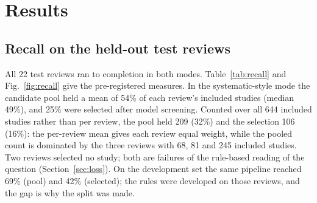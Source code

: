 \section{Results}
\label{sec:results}

\subsection{Recall on the held-out test reviews}

All 22 test reviews ran to completion in both modes. Table~\ref{tab:recall} and Fig.~\ref{fig:recall} give the
pre-registered measures. In the systematic-style mode the candidate pool held a mean of 54\% of each review's
included studies (median 49\%), and 25\% were selected after model screening. Counted over all 644 included studies
rather than per review, the pool held 209 (32\%) and the selection 106 (16\%): the per-review mean gives each review
equal weight, while the pooled count is dominated by the three reviews with 68, 81 and 245 included studies. Two
reviews selected no study; both are failures of the rule-based reading of the question
(Section~\ref{sec:loss}). On the development set the same pipeline reached 69\% (pool) and 42\% (selected); the rules
were developed on those reviews, and the gap is why the split was made.

